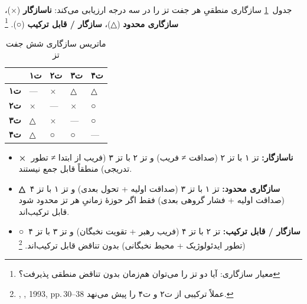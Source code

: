 \documentclass[12pt,a4paper]{book}
\newcommand{\en}[1]{\lr{\textit{#1}}}
\begin{document}
جدول~\ref{tab:compat-matrix} سازگاری منطقیِ هر جفت تز
را در سه درجه ارزیابی می‌کند:
\textbf{ناسازگار} (×)، \textbf{سازگاری محدود} (△)،
\textbf{سازگار / قابل ترکیب} (○).%
\footnote{معیار سازگاری: آیا دو تز را می‌توان
هم‌زمان بدون تناقض منطقی پذیرفت؟}

\begin{table}[ht]
\centering
\caption{ماتریس سازگاری شش جفت تز}
\label{tab:compat-matrix}
\begin{tabular}{>{\centering\arraybackslash}m{2.5cm}
                >{\centering\arraybackslash}m{2cm}
                >{\centering\arraybackslash}m{2cm}
                >{\centering\arraybackslash}m{2cm}
                >{\centering\arraybackslash}m{2cm}}
\toprule
 & \cellcolor{cGreen!20}\textbf{ت‌۱}
 & \cellcolor{cAccent!20}\textbf{ت‌۲}
 & \cellcolor{cGold!20}\textbf{ت‌۳}
 & \cellcolor{cConsolid!20}\textbf{ت‌۴} \\
\midrule
\cellcolor{cGreen!20}\textbf{ت‌۱}
  & —
  & \cellcolor{cAccent!10} ×
  & \cellcolor{cGold!10} △
  & \cellcolor{cConsolid!10} △ \\
\cellcolor{cAccent!20}\textbf{ت‌۲}
  & \cellcolor{cAccent!10} ×
  & —
  & \cellcolor{cGold!10} ×
  & \cellcolor{cConsolid!10} ○ \\
\cellcolor{cGold!20}\textbf{ت‌۳}
  & \cellcolor{cGold!10} △
  & \cellcolor{cAccent!10} ×
  & —
  & \cellcolor{cConsolid!10} ○ \\
\cellcolor{cConsolid!20}\textbf{ت‌۴}
  & \cellcolor{cConsolid!10} △
  & \cellcolor{cAccent!10} ○
  & \cellcolor{cGold!10} ○
  & —  \\
\bottomrule
\end{tabular}
\end{table}

\begin{noteBox}
\begin{itemize}[nosep]
\item \textbf{×\ ناسازگار:}
  تز ۱ با تز ۲ (صداقت ≠ فریب) و تز ۲ با تز ۳
  (فریب از ابتدا ≠ تطور تدریجی) منطقاً قابل جمع نیستند.
\item \textbf{△\ سازگاری محدود:}
  تز ۱ با تز ۳ (صداقت اولیه + تحول بعدی) و
  تز ۱ با تز ۴ (صداقت اولیه + فشار گروهی بعدی)
  فقط اگر حوزهٔ زمانیِ هر تز محدود شود قابل ترکیب‌اند.
\item \textbf{○\ سازگار / قابل ترکیب:}
  تز ۲ با تز ۴ (فریب رهبر + تقویت نخبگان) و
  تز ۳ با تز ۴ (تطور ایدئولوژیک + محیط نخبگانی)
  بدون تناقض قابل ترکیب‌اند.%
  \footnote{%
  \en{Abrahamian},
  \textit{\en{Khomeinism}}, 1993, pp.\,30–38
  عملاً ترکیبی از ت‌۲ و ت‌۴ را پیش می‌نهد.}
\end{itemize}
\end{noteBox}
\end{document}
